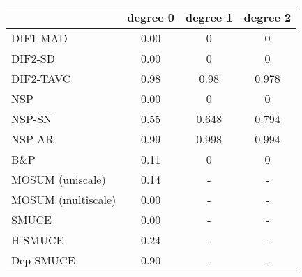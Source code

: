 \begin{tabular}{|l|c|c|c|}
  \hline
 & degree 0 & degree 1 & degree 2 \\ 
  \hline
DIF1-MAD & 0.00 & 0 & 0 \\ 
  DIF2-SD & 0.00 & 0 & 0 \\ 
  DIF2-TAVC & 0.98 & 0.98 & 0.978 \\ 
  NSP & 0.00 & 0 & 0 \\ 
  NSP-SN & 0.55 & 0.648 & 0.794 \\ 
  NSP-AR & 0.99 & 0.998 & 0.994 \\ 
  B\&P & 0.11 & 0 & 0 \\ 
  MOSUM (uniscale) & 0.14 & - & - \\ 
  MOSUM (multiscale) & 0.00 & - & - \\ 
  SMUCE & 0.00 & - & - \\ 
  H-SMUCE & 0.24 & - & - \\ 
  Dep-SMUCE & 0.90 & - & - \\ 
   \hline
\end{tabular}
